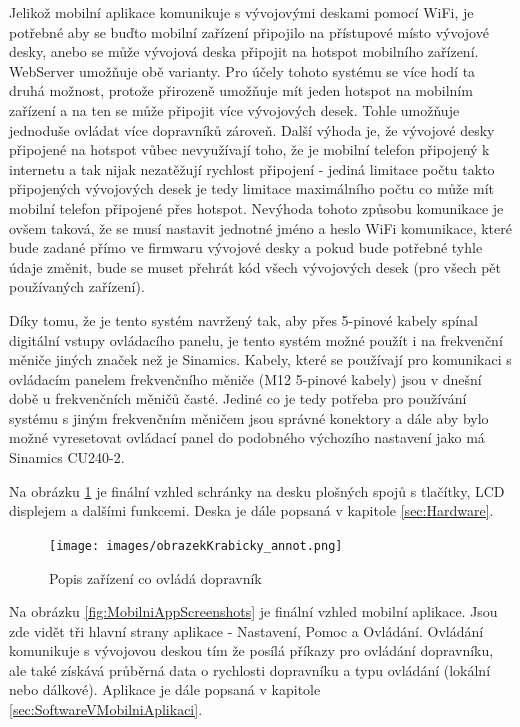Jelikož mobilní aplikace komunikuje s vývojovými deskami pomocí WiFi, je potřebné aby se buďto mobilní zařízení připojilo na přístupové místo vývojové desky, anebo se může vývojová deska připojit na hotspot mobilního zařízení. WebServer umožňuje obě varianty. Pro účely tohoto systému se více hodí ta druhá možnost, protože přirozeně umožňuje mít jeden hotspot na mobilním zařízení a na ten se může připojit více vývojových desek. Tohle umožňuje jednoduše ovládat více dopravníků zároveň. Další výhoda je, že vývojové desky připojené na hotspot vůbec nevyužívají toho, že je mobilní telefon připojený k internetu a tak nijak nezatěžují rychlost připojení - jediná limitace počtu takto připojených vývojových desek je tedy limitace maximálního počtu co může mít mobilní telefon připojené přes hotspot. Nevýhoda tohoto způsobu komunikace je ovšem taková, že se musí nastavit jednotné jméno a heslo WiFi komunikace, které bude zadané přímo ve firmwaru vývojové desky a pokud bude potřebné tyhle údaje změnit, bude se muset přehrát kód všech vývojových desek (pro všech pět používaných zařízení).

Díky tomu, že je tento systém navržený tak, aby přes 5-pinové kabely spínal digitální vstupy ovládacího panelu, je tento systém možné použít i na frekvenční měniče jiných značek než je Sinamics. Kabely, které se používají pro komunikaci s ovládacím panelem frekvenčního měniče (M12 5-pinové kabely) jsou v dnešní době u frekvenčních měničů časté. Jediné co je tedy potřeba pro používání systému s jiným frekvenčním měničem jsou správné konektory a dále aby bylo možné vyresetovat ovládací panel do podobného výchozího nastavení jako má Sinamics CU240-2.

Na obrázku \ref{fig:PopisZarizeniCoOvladaDopravnik}  je finální vzhled schránky na desku plošných spojů s tlačítky, LCD displejem a dalšími funkcemi. Deska je dále popsaná v kapitole \ref{sec:Hardware}.

\begin{figure}[hptb]
	\centering
	\texttt{[image: images/obrazekKrabicky\_annot.png]}
	\caption{Popis zařízení co ovládá dopravník}
	\label{fig:PopisZarizeniCoOvladaDopravnik}
\end{figure}

Na obrázku \ref{fig:MobilniAppScreenshots} je finální vzhled mobilní aplikace. Jsou zde vidět tři hlavní strany aplikace - Nastavení, Pomoc a Ovládání. Ovládání komunikuje s vývojovou deskou tím že posílá příkazy pro ovládání dopravníku, ale také získává průběrná data o rychlosti dopravníku a typu ovládání (lokální nebo dálkové). Aplikace je dále popsaná v kapitole \ref{sec:SoftwareVMobilniAplikaci}.

